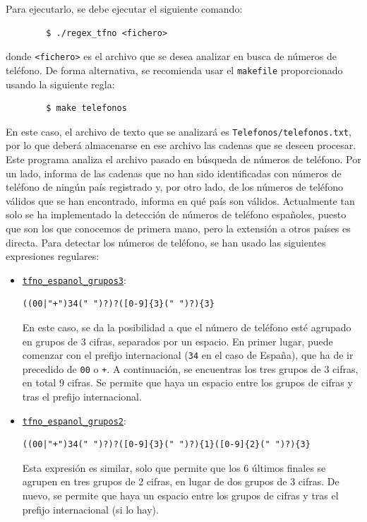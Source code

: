 \documentclass[12pt]{article}
\begin{document}
    Para ejecutarlo, se debe ejecutar el siguiente comando:
    \begin{verbatim}
        $ ./regex_tfno <fichero>
    \end{verbatim}
    donde \verb|<fichero>| es el archivo que se desea analizar en busca de números de teléfono.
    De forma alternativa, se recomienda usar el \verb|makefile| proporcionado usando la siguiente regla:
    \begin{verbatim}
        $ make telefonos
    \end{verbatim}
    En este caso, el archivo de texto que se analizará es \verb|Telefonos/telefonos.txt|, por lo que deberá almacenarse en ese archivo las cadenas que se deseen procesar.\\

    Este programa analiza el archivo pasado en búsqueda de números de teléfono. Por un lado, informa de las cadenas que no han sido identificadas con números de teléfono de ningún país registrado y, por otro lado, de los números de teléfono válidos que se han encontrado, informa en qué país son válidos. Actualmente tan solo se ha implementado la detección de números de teléfono españoles, puesto que son los que conocemos de primera mano, pero la extensión a otros países es directa.
    Para detectar los números de teléfono, se han usado las siguientes expresiones regulares:
    \begin{itemize}
        \item \ul{\texttt{tfno\_espanol\_grupos3}}:
        \begin{lstlisting}
((00|"+")34(" ")?)?([0-9]{3}(" ")?){3}
        \end{lstlisting}
        
        En este caso, se da la posibilidad a que el número de teléfono esté agrupado en grupos de 3 cifras, separados por un espacio. En primer lugar, puede comenzar con el prefijo internacional (\verb|34| en el caso de España), que ha de ir precedido de \verb|00| o \verb|+|. A continuación, se encuentras los tres grupos de 3 cifras, en total 9 cifras. Se permite que haya un espacio entre los grupos de cifras y tras el prefijo internacional.

        \item \ul{\texttt{tfno\_espanol\_grupos2}}:
        \begin{lstlisting}
((00|"+")34(" ")?)?([0-9]{3}(" ")?){1}([0-9]{2}(" ")?){3}
        \end{lstlisting}
        
        Esta expresión es similar, solo que permite que los 6 últimos finales se agrupen en tres grupos de 2 cifras, en lugar de dos grupos de 3 cifras. De nuevo, se permite que haya un espacio entre los grupos de cifras y tras el prefijo internacional (si lo hay).
    \end{itemize}
\end{document}
